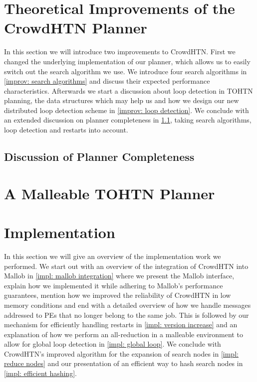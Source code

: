 \documentclass[enabledeprecatedfontcommands,12pt,a4paper,twoside]{scrartcl}
\numberwithin{equation}{section}
\begin{document}
\clearpage
\pagebreak
\section{Theoretical Improvements of the CrowdHTN Planner}
\label{improv}
In this section we will introduce two improvements to CrowdHTN. First we changed the underlying implementation of our planner, which allows us to easily switch out the search algorithm we use. We introduce four search algorithms in \ref{improv: search algorithms} and discuss their expected performance characteristics. Afterwards we start a discussion about loop detection in TOHTN planning, the data structures which may help us and how we design our new distributed loop detection scheme in \ref{improv: loop detection}. We conclude with an extended discussion on planner completeness in \ref{improv: completeness}, taking search algorithms, loop detection and restarts into account.




\subsection{Discussion of Planner Completeness}
\label{improv: completeness}

\clearpage
\pagebreak
\section{A Malleable TOHTN Planner}
\label{malleable: overview}

\clearpage
\pagebreak
\section{Implementation}
\label{impl}
In this section we will give an overview of the implementation work we performed. We start out with an overview of the integration of CrowdHTN into Mallob in \ref{impl: mallob integration} where we present the Mallob interface, explain how we implemented it while adhering to Mallob's performance guarantees, mention how we improved the reliability of CrowdHTN in low memory conditions and end with a detailed overview of how we handle messages addressed to PEs that no longer belong to the same job. This is followed by our mechanism for efficiently handling restarts in \ref{impl: version increase} and an explanation of how we perform an all-reduction in a malleable environment to allow for global loop detection in \ref{impl: global loop}. We conclude with CrowdHTN's improved algorithm for the expansion of search nodes in \ref{impl: reduce nodes} and our presentation of an efficient way to hash search nodes in \ref{impl: efficient hashing}.


\clearpage
\pagebreak
\end{document}
